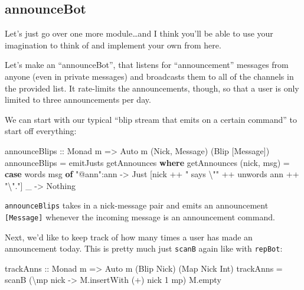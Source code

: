 \documentclass[]{article}
\newenvironment{Shaded}{}{}
\newcommand{\DataTypeTok}[1]{\textcolor[rgb]{0.56,0.13,0.00}{#1}}
\newcommand{\DecValTok}[1]{\textcolor[rgb]{0.25,0.63,0.44}{#1}}
\newcommand{\FunctionTok}[1]{\textcolor[rgb]{0.02,0.16,0.49}{#1}}
\newcommand{\KeywordTok}[1]{\textcolor[rgb]{0.00,0.44,0.13}{\textbf{#1}}}
\newcommand{\NormalTok}[1]{#1}
\newcommand{\OperatorTok}[1]{\textcolor[rgb]{0.40,0.40,0.40}{#1}}
\newcommand{\OtherTok}[1]{\textcolor[rgb]{0.00,0.44,0.13}{#1}}
\newcommand{\StringTok}[1]{\textcolor[rgb]{0.25,0.44,0.63}{#1}}
\begin{document}
\subsection{announceBot}\label{announcebot}

Let's just go over one more module\ldots and I think you'll be able to use your
imagination to think of and implement your own from here.

Let's make an ``announceBot'', that listens for ``announcement'' messages from
anyone (even in private messages) and broadcasts them to all of the channels in
the provided list. It rate-limits the announcements, though, so that a user is
only limited to three announcements per day.

We can start with our typical ``blip stream that emits on a certain command'' to
start off everything:

\begin{Shaded}
\begin{Highlighting}[]
\OtherTok{announceBlips ::} \DataTypeTok{Monad}\NormalTok{ m }\OtherTok{=\textgreater{}} \DataTypeTok{Auto}\NormalTok{ m (}\DataTypeTok{Nick}\NormalTok{, }\DataTypeTok{Message}\NormalTok{) (}\DataTypeTok{Blip}\NormalTok{ [}\DataTypeTok{Message}\NormalTok{])}
\NormalTok{announceBlips }\OtherTok{=}\NormalTok{ emitJusts getAnnounces}
  \KeywordTok{where}
\NormalTok{    getAnnounces (nick, msg) }\OtherTok{=}
      \KeywordTok{case} \FunctionTok{words}\NormalTok{ msg }\KeywordTok{of}
        \StringTok{"@ann"}\OperatorTok{:}\NormalTok{ann }\OtherTok{{-}\textgreater{}} \DataTypeTok{Just}\NormalTok{ [nick }\OperatorTok{++} \StringTok{" says \textbackslash{}""} \OperatorTok{++} \FunctionTok{unwords}\NormalTok{ ann }\OperatorTok{++} \StringTok{"\textbackslash{}"."}\NormalTok{]}
\NormalTok{        \_          }\OtherTok{{-}\textgreater{}} \DataTypeTok{Nothing}
\end{Highlighting}
\end{Shaded}

\texttt{announceBlips} takes in a nick-message pair and emits an announcement
\texttt{{[}Message{]}} whenever the incoming message is an announcement command.

Next, we'd like to keep track of how many times a user has made an announcement
today. This is pretty much just \texttt{scanB} again like with \texttt{repBot}:

\begin{Shaded}
\begin{Highlighting}[]
\OtherTok{trackAnns ::} \DataTypeTok{Monad}\NormalTok{ m }\OtherTok{=\textgreater{}} \DataTypeTok{Auto}\NormalTok{ m (}\DataTypeTok{Blip} \DataTypeTok{Nick}\NormalTok{) (}\DataTypeTok{Map} \DataTypeTok{Nick} \DataTypeTok{Int}\NormalTok{)}
\NormalTok{trackAnns }\OtherTok{=}\NormalTok{ scanB (\textbackslash{}mp nick }\OtherTok{{-}\textgreater{}}\NormalTok{ M.insertWith (}\OperatorTok{+}\NormalTok{) nick }\DecValTok{1}\NormalTok{ mp) M.empty}
\end{Highlighting}
\end{Shaded}
\end{document}
